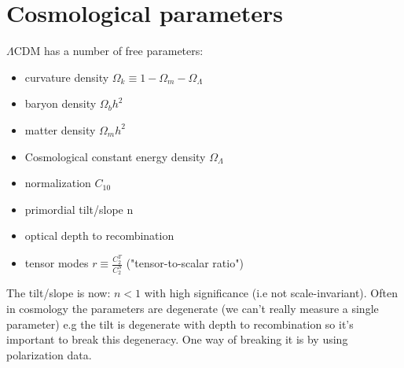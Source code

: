 \documentclass{article}
\begin{document}
\section{Cosmological parameters}
$\Lambda$CDM has a number of free parameters:
\begin{itemize}
  \item curvature density $\Omega_k \equiv 1 - \Omega_m - \Omega_\Lambda$
  \item baryon density $\Omega_b h^2$
  \item matter density $\Omega_m h^2$
  \item Cosmological constant energy density $\Omega_\Lambda$
  \item normalization $C_10$
  \item primordial tilt/slope n
  \item optical depth to recombination
  \item tensor modes $r\equiv \frac{C_2^T}{C_2^S}$ ("tensor-to-scalar ratio")
\end{itemize}
The tilt/slope is now: $n<1$ with high significance (i.e not scale-invariant). Often in cosmology the parameters are degenerate (we can't really measure a single parameter) e.g the tilt is degenerate with depth to recombination so it's important to break this degeneracy. One way of breaking it is by using polarization data.
\end{document}
